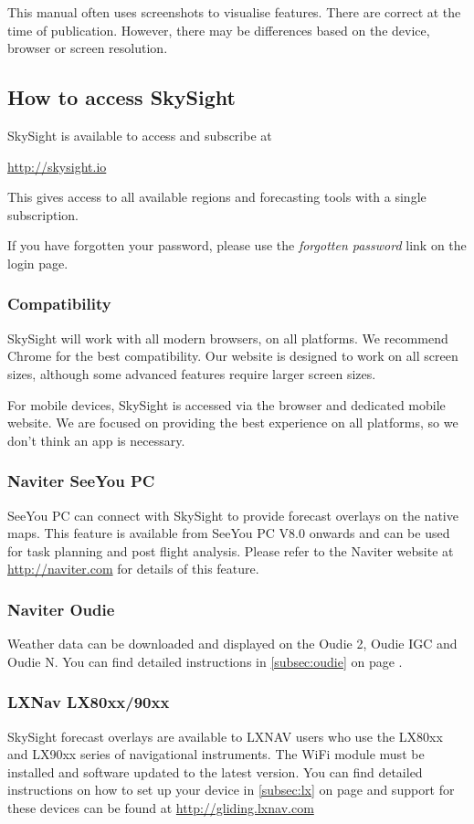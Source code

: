 \documentclass[11pt,a4paper]{article}
\begin{document}
This manual often uses screenshots to visualise features. There are correct at the time of publication. However, there may be differences based on the device, browser or screen resolution.

\subsection{How to access SkySight}
SkySight is available to access and subscribe at

\url{http://skysight.io}

This gives access to all available regions and forecasting tools with a single subscription.

If you have forgotten your password, please use the \emph{forgotten password} link on the login page.


\subsubsection{Compatibility}
SkySight will work with all modern browsers, on all platforms. We recommend Chrome for the best compatibility. Our website is designed to work on all screen sizes, although some advanced features require larger screen sizes.

For mobile devices, SkySight is accessed via the browser and dedicated mobile website. We are focused on providing the best experience on all platforms, so we don't think an app is necessary.

\subsubsection{Naviter SeeYou PC}
SeeYou PC can connect with SkySight to provide forecast overlays on the native maps. This feature is available from SeeYou PC V8.0 onwards and can be used for task planning and post flight analysis. Please refer to the Naviter website at \url{http://naviter.com} for details of this feature.
\subsubsection{Naviter Oudie}
Weather data can be downloaded and displayed on the Oudie 2, Oudie IGC and Oudie N. You can find detailed instructions in \ref{subsec:oudie} on page \pageref{subsec:oudie}.
\subsubsection{LXNav LX80xx/90xx}
SkySight forecast overlays are available to LXNAV users who use the LX80xx and LX90xx series of navigational instruments. The WiFi module must be installed and software updated to the latest version. You can find detailed instructions on how to set up your device in \ref{subsec:lx} on page \pageref{subsec:lx} and support for these devices can be found at \url{http://gliding.lxnav.com}
\end{document}
